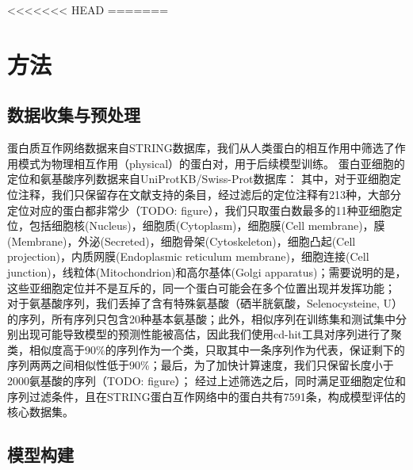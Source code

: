 \documentclass[a4paper,UTF8]{article}
\begin{document}
<<<<<<< HEAD
=======
\section{方法}

\subsection{数据收集与预处理}

蛋白质互作网络数据来自STRING数据库，我们从人类蛋白的相互作用中筛选了作用模式为物理相互作用（physical）的蛋白对，用于后续模型训练。
蛋白亚细胞的定位和氨基酸序列数据来自UniProtKB/Swiss-Prot数据库：
其中，对于亚细胞定位注释，我们只保留存在文献支持的条目，经过滤后的定位注释有213种，大部分定位对应的蛋白都非常少（TODO: figure），我们只取蛋白数最多的11种亚细胞定位，包括细胞核(Nucleus)，细胞质(Cytoplasm)，细胞膜(Cell membrane)，膜(Membrane)，外泌(Secreted)，细胞骨架(Cytoskeleton)，细胞凸起(Cell projection)，内质网膜(Endoplasmic reticulum membrane)，细胞连接(Cell junction)，线粒体(Mitochondrion)和高尔基体(Golgi apparatus)；需要说明的是，这些亚细胞定位并不是互斥的，同一个蛋白可能会在多个位置出现并发挥功能；
对于氨基酸序列，我们丢掉了含有特殊氨基酸（硒半胱氨酸，Selenocysteine, U）的序列，所有序列只包含20种基本氨基酸；此外，相似序列在训练集和测试集中分别出现可能导致模型的预测性能被高估，因此我们使用cd-hit工具对序列进行了聚类，相似度高于90\%的序列作为一个类，只取其中一条序列作为代表，保证剩下的序列两两之间相似性低于90\%；最后，为了加快计算速度，我们只保留长度小于2000氨基酸的序列（TODO: figure）；
经过上述筛选之后，同时满足亚细胞定位和序列过滤条件，且在STRING蛋白互作网络中的蛋白共有7591条，构成模型评估的核心数据集。

\subsection{模型构建}
\end{document}
